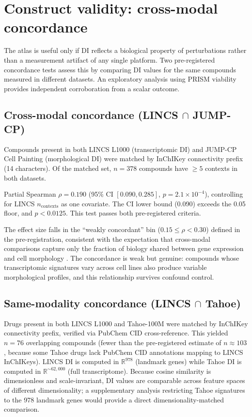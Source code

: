\documentclass[11pt]{article}
\begin{document}
\section{Construct validity: cross-modal concordance}
\label{sec:concordance}

The atlas is useful only if DI reflects a biological property of
perturbations rather than a measurement artifact of any single platform.
Two pre-registered concordance tests assess this by comparing
DI values for the same compounds measured in different datasets.  An
exploratory analysis using PRISM viability provides independent
corroboration from a scalar outcome.

\subsection{Cross-modal concordance (LINCS \texorpdfstring{$\cap$}{∩} JUMP-CP)}

Compounds present in both LINCS L1000 (transcriptomic DI) and JUMP-CP
Cell Painting (morphological DI) were matched by InChIKey connectivity
prefix (14 characters).  Of the matched set, $n = 378$ compounds have
$\geq 5$ contexts in both datasets.

Partial Spearman $\rho = 0.190$ (95\% CI $[0.090, 0.285]$,
$p = 2.1 \times 10^{-4}$), controlling for LINCS $n_{\mathrm{contexts}}$
as one covariate.  The CI lower bound (0.090) exceeds the 0.05 floor,
and $p < 0.0125$.  This test passes both pre-registered criteria.

The effect size falls in the ``weakly concordant'' bin
($0.15 \leq \rho < 0.30$) defined in the pre-registration, consistent
with the expectation that cross-modal comparisons capture only the
fraction of biology shared between gene expression and cell morphology
\citep{haghighi2022crossmodal}.  The concordance is weak but genuine:
compounds whose transcriptomic signatures vary across cell lines also
produce variable morphological profiles, and this relationship survives
confound control.

\subsection{Same-modality concordance (LINCS \texorpdfstring{$\cap$}{∩} Tahoe)}

Drugs present in both LINCS L1000 and Tahoe-100M were matched by
InChIKey connectivity prefix, verified via PubChem CID cross-reference.
This yielded $n = 76$ overlapping compounds (fewer than the
pre-registered estimate of $n \approx 103$, because some Tahoe drugs
lack PubChem CID annotations mapping to LINCS InChIKeys).  LINCS DI is
computed in $\mathbb{R}^{978}$ (landmark genes) while Tahoe DI is
computed in $\mathbb{R}^{\sim 62{,}000}$ (full transcriptome).  Because
cosine similarity is dimensionless and scale-invariant, DI values are
comparable across feature spaces of different dimensionality; a
supplementary analysis restricting Tahoe signatures to the 978 landmark
genes would provide a direct dimensionality-matched comparison.
\end{document}
